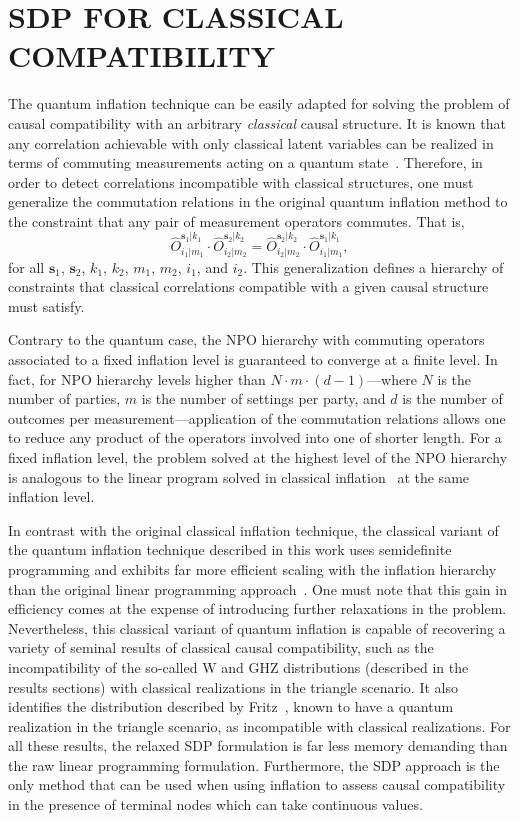 \documentclass[superscriptaddress,aps,prx,nofootinbib,twocolumn,twoside,reprint,letterpaper,longbibliography]{revtex4-2}
\begin{document}
\section{SDP FOR CLASSICAL COMPATIBILITY}\label{sec:classical}
The quantum inflation technique can be easily adapted for solving the problem of causal compatibility with an arbitrary \emph{classical} causal structure.
It is known that any correlation achievable with only classical latent variables can be realized in terms of commuting measurements acting on a quantum state~\cite{baccari2017classical}.
Therefore, in order to detect correlations incompatible with classical structures, one must generalize the commutation relations in the original quantum inflation method to the constraint that any pair of measurement operators commutes. That is,
\begin{equation*}
    \hat{O}^{\boldsymbol{s}_1|k_1}_{i_1|m_1}  \!\!\cdot \hat{O}^{\boldsymbol{s}_2|k_2}_{i_2|m_2} =
\hat{O}^{\boldsymbol{s}_2|k_2}_{i_2|m_2}  \!\!\cdot \hat{O}^{\boldsymbol{s}_1|k_1}_{i_1|m_1},
\end{equation*}
for all $\boldsymbol{s}_1$, $\boldsymbol{s}_2$, $k_1$, $k_2$, $m_1$, $m_2$, $i_1$, and $i_2$.
This generalization defines a hierarchy of constraints that classical correlations compatible with a given causal structure must satisfy.

Contrary to the quantum case, the NPO hierarchy with commuting operators associated to a fixed inflation level is guaranteed to converge at a finite level.
In fact, for NPO hierarchy levels higher than $N\cdot m\cdot(d{-}1)$---where $N$ is the number of parties, $m$ is the number of settings per party, and $d$ is the number of outcomes per measurement---application of the commutation relations allows one to reduce any product of the operators involved into one of shorter length.
For a fixed inflation level, the problem solved at the highest level of the NPO hierarchy is analogous to the linear program solved in classical inflation~\cite{wolfe2016inflation} at the same inflation level.

In contrast with the original classical inflation technique, the classical variant of the quantum inflation technique described in this work uses semidefinite programming and exhibits far more efficient scaling with the inflation hierarchy than the original linear programming approach~\cite{navascues2017inflation}.
One must note that this gain in efficiency comes at the expense of introducing further relaxations in the problem.
Nevertheless, this classical variant of quantum inflation is capable of recovering a variety of seminal results of classical causal compatibility, such as the incompatibility of the so-called W and GHZ distributions (described in the results sections) with classical realizations in the triangle scenario.
It also identifies the distribution described by Fritz~\cite{fritz2012bell}, known to have a quantum realization in the triangle scenario, as incompatible with classical realizations.
For all these results, the relaxed SDP formulation is far less memory demanding than the raw linear programming formulation.
Furthermore, the SDP approach is the only method that can be used when using inflation to assess causal compatibility in the presence of terminal nodes which can take continuous values.
\end{document}
